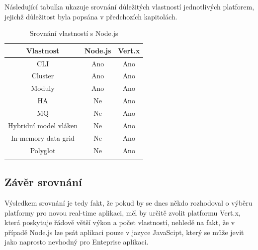 Následující tabulka ukazuje srovnání důležitých vlastností jednotlivých platforem, jejichž důležitost byla popsána v předchozích kapitolách.

\begin{flushleft}
\begin{longtable}{|c|c|c|}
\hline
\textsf{\textbf{Vlastnost}} & \textsf{\textbf{Node.js}} & \textsf{\textbf{Vert.x}}\tabularnewline
\hline
CLI & Ano & Ano\tabularnewline
\hline 
Cluster & Ano & Ano\tabularnewline
\hline
Moduly & Ano & Ano\tabularnewline
\hline 
HA & Ne & Ano\tabularnewline
\hline
MQ & Ne & Ano\tabularnewline
\hline 
Hybridní model vláken & Ne & Ano\tabularnewline
\hline 
In-memory data grid & Ne & Ano\tabularnewline
\hline 
Polyglot & Ne & Ano\tabularnewline
\hline
\caption{Srovnání vlastností s Node.js}
\end{longtable}
\par\end{flushleft}

\subsection{Závěr srovnání}

Výsledkem srovnání je tedy fakt, že pokud by se dnes někdo rozhodoval o výběru platformy pro novou real-time aplikaci, měl by určitě zvolit platformu Vert.x, která poskytuje řádově větší výkon a počet vlastností, nehledě na fakt, že v případě Node.js lze psát aplikaci pouze v jazyce JavaScipt, který se může jevit jako naprosto nevhodný pro Enteprise aplikaci.